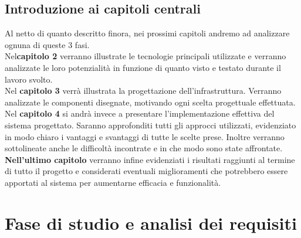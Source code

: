 \documentclass[a4paper,12pt]{report}
\begin{document}
\section{Introduzione ai capitoli centrali}
Al netto di quanto descritto finora, nei prossimi capitoli andremo ad analizzare ognuna di queste 3 fasi. \\
Nel\textbf{capitolo 2} verranno illustrate le tecnologie principali utilizzate e verranno analizzate le loro potenzialità in funzione di quanto visto e testato durante il lavoro svolto. \\
Nel \textbf{capitolo 3} verrà illustrata la progettazione dell'infrastruttura. Verranno analizzate le componenti disegnate, motivando ogni scelta progettuale effettuata. \\
Nel \textbf{capitolo 4} si andrà invece a presentare l'implementazione effettiva del sistema progettato. Saranno approfonditi tutti gli approcci utilizzati, evidenziato in modo chiaro i vantaggi e svantaggi di tutte le scelte prese. Inoltre verranno sottolineate anche le difficoltà incontrate e in che modo sono state affrontate. \\
\textbf{Nell'ultimo capitolo} verranno infine evidenziati i risultati raggiunti al termine di tutto il progetto e considerati eventuali miglioramenti che potrebbero essere apportati al sistema per aumentarne efficacia e funzionalità.
\chapter{Fase di studio e analisi dei requisiti}
\end{document}
